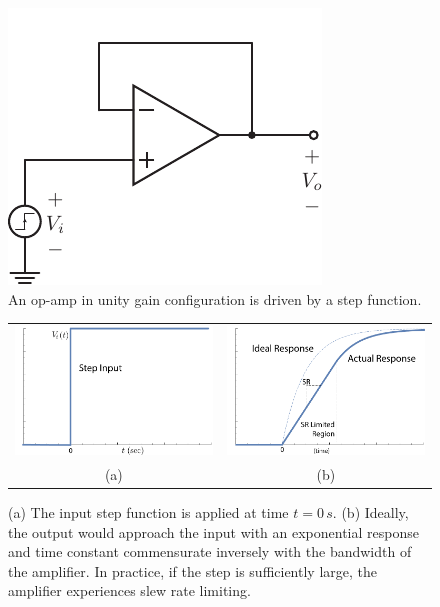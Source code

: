 \begin{figure}[t]
\centering
\includegraphics[scale=1.15]{opamp_unitygain_step}
\caption{An op-amp in unity gain configuration is driven by a step function.}
\label{fig:opamp_unitygain_step_fig}
\end{figure}
\begin{figure}[H]
\centering
\begin{tabular}{cc}
\includegraphics[width=.45\columnwidth]{step_input} &
\includegraphics[width=.45\columnwidth]{exp_slew}\\
(a) & (b)\\
\end{tabular}
\caption{(a) The input step function is applied at time $t=0\,s$.  (b) Ideally, the output would approach the input with an exponential response and time constant commensurate inversely with the bandwidth of the amplifier. In practice, if the step is sufficiently large, the amplifier experiences slew rate limiting.}
\label{fig:step_input}
\end{figure}
